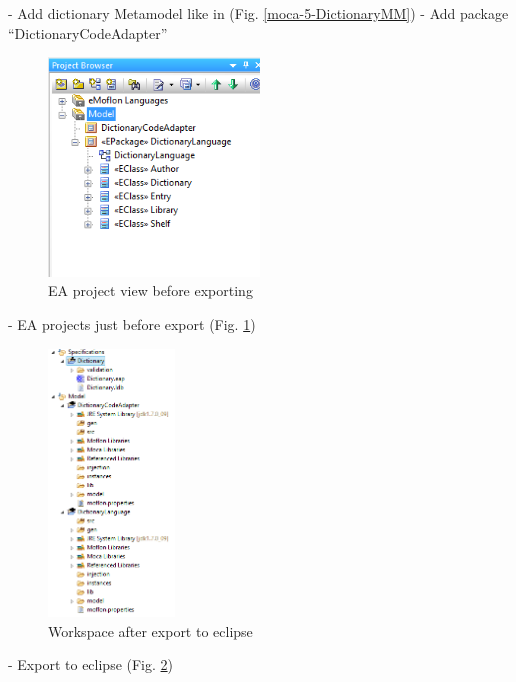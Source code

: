 - Add dictionary Metamodel like in (Fig. \ref{moca-5-DictionaryMM})
- Add package ``DictionaryCodeAdapter''

\begin{figure}[htp]
\begin{center}
 \includegraphics[width=0.5\textwidth]{pics/moca/1DictionaryMetaModel/5-DictionaryMM-ProjectBrowser}
  \caption{EA project view before exporting}
  \label{moca-5-DictionaryMM-ProjectBrowser}
\end{center}
\end{figure}

- EA projects just before export (Fig. \ref{moca-5-DictionaryMM-ProjectBrowser}) 

\begin{figure}[htp]
\begin{center}
 \includegraphics[width=0.3\textwidth]{pics/moca/1DictionaryMetaModel/6-ExportToEclipse}
  \caption{Workspace after export to eclipse}
  \label{moca-6-ExportToEclipse}
\end{center}
\end{figure}

- Export to eclipse  (Fig. \ref{moca-6-ExportToEclipse})
